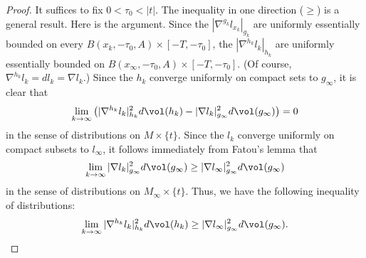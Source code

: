 \begin{proof}
It suffices to fix $0<\tau_0<|t|$.
 The inequality in one direction ($\ge$) is a general
result. Here is the argument.  Since the $|\nabla^{g_k} l_{x_k}|_{g_k}$ are
uniformly essentially bounded on every $B(x_k,-\tau_0,A)\times [-T,-\tau_0]$,
the $|\nabla^{h_k}l_k|_{h_k}$ are uniformly essentially bounded on
$B(x_\infty,-\tau_0,A)\times [-T,-\tau_0]$. (Of course,
$\nabla^{h_k}l_k=dl_k=\nabla l_k$.) Since the $h_k$ converge uniformly on
compact sets to $g_\infty$, it is clear that
\begin{equation}\label{firstdist} \lim_{k\rightarrow\infty}\left(|\nabla^{h_k}l_k|^2_{h_k}d\vol(h_k)-|\nabla l_k|_{g_\infty}^2d\vol(g_\infty)\right)=0\end{equation} in the sense of distributions
on $M\times \{t\}$.
 Since the $
l_k$ converge uniformly on compact subsets to $l_\infty$, it follows
immediately from Fatou's lemma that
$$\lim_{k\rightarrow \infty}|\nabla
l_k|^2_{g_\infty}d\vol(g_\infty)\ge|\nabla
l_\infty|^2_{g_\infty}d\vol (g_\infty)$$ in the sense of
distributions on $M_\infty\times \{t\}$. Thus, we have the following
inequality of distributions:
$$\lim_{k\rightarrow\infty}|\nabla^{h_k}l_k|^2_{h_k}d\vol(h_k)\ge
|\nabla l_\infty|^2_{g_\infty}d\vol (g_\infty).$$


\end{proof}
